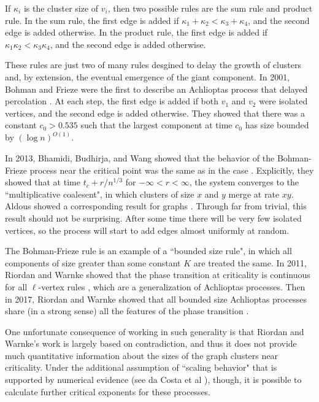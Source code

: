 \documentclass[twoside,10pt]{article}
\begin{document}
If $\kappa_i$ is the cluster size of $v_{i}$, then two possible rules are the sum rule and product rule. In the sum rule, the first edge is added if $\kappa_1+\kappa_2 < \kappa_3+\kappa_4$, and the second edge is added otherwise. In the product rule, the first edge is added if $\kappa_1 \kappa_2 < \kappa_3 \kappa_4$, and the second edge is added otherwise.

These rules are just two of many rules desgined to delay the growth of clusters and, by extension, the eventual emergence of the giant component. In 2001, Bohman and Frieze were the first to describe an Achlioptas process that delayed percolation \cite{BF}. At each step, the first edge is added if both $v_1$ and $v_2$ were isolated vertices, and the second edge is added otherwise. They showed that there was a constant $c_0>0.535$ such that the largest component at time $c_0$ has size bounded by $(\log n)^{O(1)}$.

In 2013, Bhamidi, Budhirja, and Wang showed that the behavior of the Bohman-Frieze process near the critical point was the same as in the \ER case \cite{coal}. Explicitly, they showed that at time $t_c + r/n^{1/3}$ for $-\infty<r<\infty$, the system converges to the ``multiplicative coalesent", in which clusters of size $x$ and $y$ merge at rate $xy$. Aldous showed a corresponding result for \ER graphs \cite{Aldous}. Through far from trivial, this result should not be surprising. After some time there will be very few isolated vertices, so the process will start to add edges almost uniformly at random.

The Bohman-Frieze rule is an example of a ``bounded size rule", in which all components of size greater than some constant $K$ are treated the same. In 2011, Riordan and Warnke showed that the phase transition at criticality is continuous for all $\ell$-vertex rules \cite{RW-cont}, which are a generalization of Achlioptas processes. Then in 2017, Riordan and Warnke showed that all bounded size Achlioptas processes share (in a strong sense) all the features of the \ER phase transition \cite{RW-bounded}.

One unfortunate consequence of working in such generality is that Riordan and Warnke's work is largely based on contradiction, and thus it does not provide much quantitative information about the sizes of the graph clusters near criticality. Under the additional assumption of ``scaling behavior" that is supported by numerical evidence (see da Costa et al \cite{daCosta}), though, it is possible to calculate further critical exponents for these processes.
\end{document}
